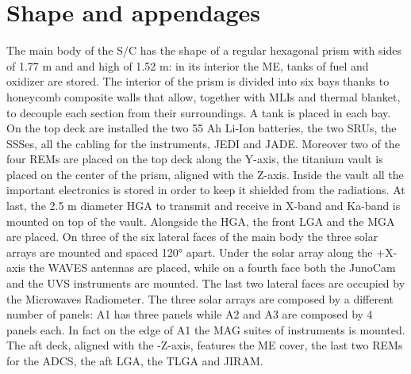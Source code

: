 \section{Shape and appendages}
\label{sec:shape_appendages}
The main body of the S/C has the shape of a regular hexagonal prism with sides of 1.77 m and and high of 1.52 m: in its interior the ME, tanks of fuel and oxidizer are stored. The interior of the prism is divided into six bays thanks to honeycomb composite walls that allow, together with MLIs and thermal blanket, to decouple each section from their surroundings. A tank is placed in each bay. On the top deck are installed the two 55 Ah Li-Ion batteries, the two SRUs, the SSSes, all the cabling for the instruments, JEDI and JADE. Moreover two of the four REMs are placed on the top deck along the Y-axis, the titanium vault is placed on the center of the prism, aligned with the Z-axis. Inside the vault all the important electronics is stored in order to keep it shielded from the radiations. At last, the 2.5 m diameter HGA to transmit and receive in X-band and Ka-band is mounted on top of the vault. Alongside the HGA, the front LGA and the MGA are placed. On three of the six lateral faces of the main body the three solar arrays are mounted and spaced 120° apart. Under the solar array along the +X-axis the WAVES antennas are placed, while on a fourth face both the JunoCam and the UVS instruments are mounted. The last two lateral faces are occupied by the Microwaves Radiometer. The three solar arrays are composed by a different number of panels: A1 has three panels while A2 and A3 are composed by 4 panels each. In fact on the edge of A1 the MAG suites of instruments is mounted. The aft deck, aligned with the -Z-axis, features the ME cover, the last two REMs for the ADCS, the aft LGA, the TLGA and JIRAM.

